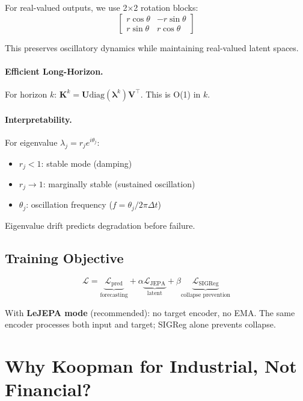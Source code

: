 \documentclass{article}
\begin{document}
For real-valued outputs, we use 2×2 rotation blocks:
\begin{equation}
    \begin{bmatrix} r\cos\theta & -r\sin\theta \\ r\sin\theta & r\cos\theta \end{bmatrix}
\end{equation}

This preserves oscillatory dynamics while maintaining real-valued latent spaces.

\paragraph{Efficient Long-Horizon.} For horizon $k$: $\mathbf{K}^k = \mathbf{U} \text{diag}(\boldsymbol{\lambda}^k) \mathbf{V}^\top$. This is O(1) in $k$.

\paragraph{Interpretability.} For eigenvalue $\lambda_j = r_j e^{i\theta_j}$:
\begin{itemize}
    \item $r_j < 1$: stable mode (damping)
    \item $r_j \rightarrow 1$: marginally stable (sustained oscillation)
    \item $\theta_j$: oscillation frequency ($f = \theta_j / 2\pi\Delta t$)
\end{itemize}
Eigenvalue drift predicts degradation before failure.

\subsection{Training Objective}

\begin{equation}
    \mathcal{L} = \underbrace{\mathcal{L}_{\text{pred}}}_{\text{forecasting}} + \alpha \underbrace{\mathcal{L}_{\text{JEPA}}}_{\text{latent}} + \beta \underbrace{\mathcal{L}_{\text{SIGReg}}}_{\text{collapse prevention}}
\end{equation}

With \textbf{LeJEPA mode} (recommended): no target encoder, no EMA. The same encoder processes both input and target; SIGReg alone prevents collapse.

\section{Why Koopman for Industrial, Not Financial?}
\end{document}
